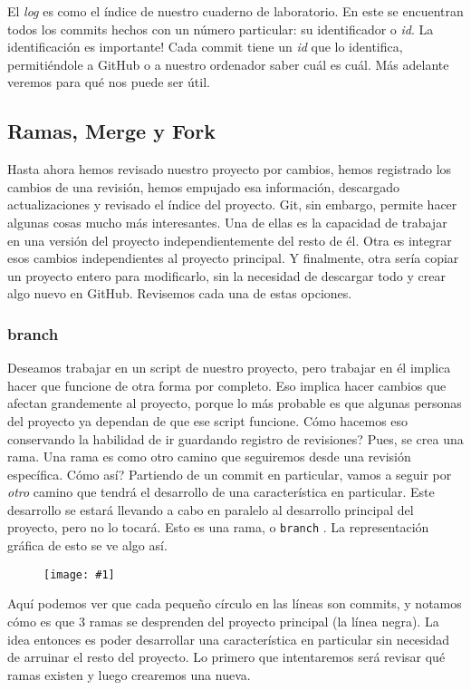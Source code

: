 \documentclass[10pt,letterpaper]{article}
\newcommand{\inlinecode}[1]{
\colorbox{light-gray}{\texttt{#1}}
}
\newcommand{\Picture}[1]
{
	\begin{figure}[H]
	\begin{flushleft}
	\texttt{[image: \#1]}
	\end{flushleft}
	\end{figure}
}
\begin{document}
El \emph{log} es como el \'indice de nuestro cuaderno de laboratorio. En este se encuentran todos los commits hechos con un n\'umero particular: su identificador o \emph{id}. La identificaci\'on es importante! Cada commit tiene un \emph{id} que lo identifica, permiti\'endole a GitHub o a nuestro ordenador saber cu\'al es cu\'al. M\'as adelante veremos para qu\'e nos puede ser \'util.

\subsection{Ramas, Merge y Fork}
Hasta ahora hemos revisado nuestro proyecto por cambios, hemos registrado los cambios de una revisi\'on, hemos empujado esa informaci\'on, descargado actualizaciones y revisado el \'indice del proyecto. Git, sin embargo, permite hacer algunas cosas mucho m\'as interesantes. Una de ellas es la capacidad de trabajar en una versi\'on del proyecto independientemente del resto de \'el. Otra es integrar esos cambios independientes al proyecto principal. Y finalmente, otra ser\'ia copiar un proyecto entero para modificarlo, sin la necesidad de descargar todo y crear algo nuevo en GitHub. Revisemos cada una de estas opciones.

\subsubsection{branch}
Deseamos trabajar en un script de nuestro proyecto, pero trabajar en \'el implica hacer que funcione de otra forma por completo. Eso implica hacer cambios que afectan grandemente al proyecto, porque lo m\'as probable es que algunas personas del proyecto ya dependan de que ese script funcione. C\'omo hacemos eso conservando la habilidad de ir guardando registro de revisiones? Pues, se crea una rama. Una rama es como otro camino que seguiremos desde una revisi\'on espec\'ifica. C\'omo as\'i? Partiendo de un commit en particular, vamos a seguir por \emph{otro} camino que tendr\'a el desarrollo de una caracter\'istica en particular. Este desarrollo se estar\'a llevando a cabo en paralelo al desarrollo principal del proyecto, pero no lo tocar\'a. Esto es una rama, o \inlinecode{branch}. La representaci\'on gr\'afica de esto se ve algo as\'i.

\Picture{img/branch.png}

Aqu\'i podemos ver que cada peque\~no c\'irculo en las l\'ineas son commits, y notamos c\'omo es que 3 ramas se desprenden del proyecto principal (la l\'inea negra). La idea entonces es poder desarrollar una caracter\'istica en particular sin necesidad de arruinar el resto del proyecto. Lo primero que intentaremos ser\'a revisar qu\'e ramas existen y luego crearemos una nueva.\\
\end{document}
